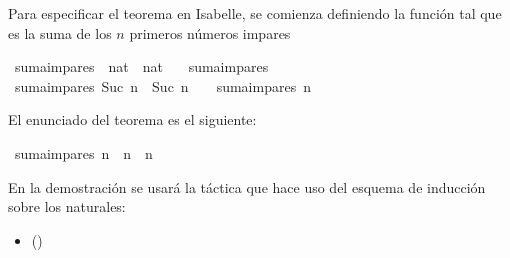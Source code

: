 \begin{isabellebody}
\begin{isamarkuptext}
  Para especificar el teorema en Isabelle, se comienza definiendo 
  la función  tal que  es la 
  suma de los $n$ primeros números impares%
\end{isamarkuptext}\isamarkuptrue%
\isamarkupfalse%
\ suma{\isacharunderscore}impares\ {\isacharcolon}{\isacharcolon}\ {\isachardoublequoteopen}nat\ {\isasymRightarrow}\ nat{\isachardoublequoteclose}\ \isanewline
\ \ {\isachardoublequoteopen}suma{\isacharunderscore}impares\ {}\ {\isacharequal}\ {}{\isachardoublequoteclose}\ \isanewline
{\isacharbar}\ {\isachardoublequoteopen}suma{\isacharunderscore}impares\ {\isacharparenleft}Suc\ n{\isacharparenright}\ {\isacharequal}\ {\isacharparenleft}{}{\isacharasterisk}{\isacharparenleft}Suc\ n{\isacharparenright}\ {\isacharminus}\ {}{\isacharparenright}\ {\isacharplus}\ suma{\isacharunderscore}impares\ n{\isachardoublequoteclose}%
\begin{isamarkuptext}%
El enunciado del teorema es el siguiente:%
\end{isamarkuptext}\isamarkuptrue%
\isamarkupfalse%
\ {\isachardoublequoteopen}suma{\isacharunderscore}impares\ n\ {\isacharequal}\ n\ {\isacharasterisk}\ n{\isachardoublequoteclose}\isanewline
%
\isadelimproof
%
\endisadelimproof
%
\isatagproof
{}\isamarkupfalse%
%
\endisatagproof
{\isafoldproof}%
%
\isadelimproof
%
\endisadelimproof
%
\begin{isamarkuptext}%
En la demostración se usará la táctica  que hace
  uso del esquema de inducción sobre los naturales:
  \begin{itemize}
  \item[]  \hfill ()
  \end{itemize}


\end{isamarkuptext}
\end{isabellebody}
